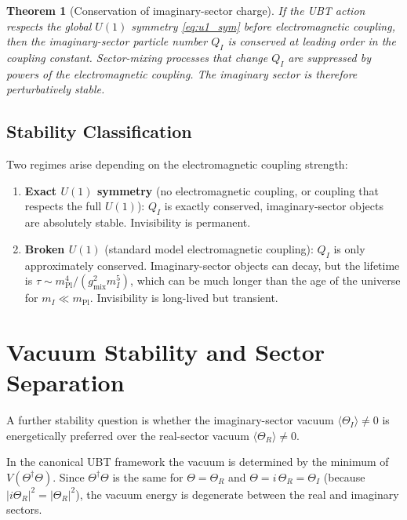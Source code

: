 \documentclass[12pt]{article}
\newtheorem{theorem}{Theorem}
\begin{document}
\begin{theorem}[Conservation of imaginary-sector charge]
\label{thm:charge_conservation}
If the UBT action respects the global $U(1)$ symmetry \eqref{eq:u1_sym}
before electromagnetic coupling, then the imaginary-sector particle
number $Q_I$ is conserved at leading order in the coupling constant.
Sector-mixing processes that change $Q_I$ are suppressed by powers
of the electromagnetic coupling.  The imaginary sector is therefore
\emph{perturbatively stable}.
\end{theorem}

\subsection{Stability Classification}

Two regimes arise depending on the electromagnetic coupling strength:

\begin{enumerate}
  \item \textbf{Exact $U(1)$ symmetry} (no electromagnetic coupling,
    or coupling that respects the full $U(1)$): $Q_I$ is exactly
    conserved, imaginary-sector objects are absolutely stable.
    Invisibility is permanent.

  \item \textbf{Broken $U(1)$} (standard model electromagnetic
    coupling): $Q_I$ is only approximately conserved.
    Imaginary-sector objects can decay, but the lifetime is
    $\tau \sim m_\mathrm{Pl}^4 / (g_\mathrm{mix}^2 m_I^5)$, which
    can be much longer than the age of the universe for
    $m_I \ll m_\mathrm{Pl}$.  Invisibility is long-lived but transient.
\end{enumerate}

\section{Vacuum Stability and Sector Separation}

A further stability question is whether the imaginary-sector vacuum
$\langle\Theta_I\rangle \neq 0$ is energetically preferred over the
real-sector vacuum $\langle\Theta_R\rangle \neq 0$.

In the canonical UBT framework the vacuum is determined by the
minimum of $V(\Theta^\dagger\Theta)$.  Since $\Theta^\dagger\Theta$
is the same for $\Theta = \Theta_R$ and $\Theta = i\,\Theta_R =
\Theta_I$ (because $|i\Theta_R|^2 = |\Theta_R|^2$), the vacuum
energy is degenerate between the real and imaginary sectors.
\end{document}
